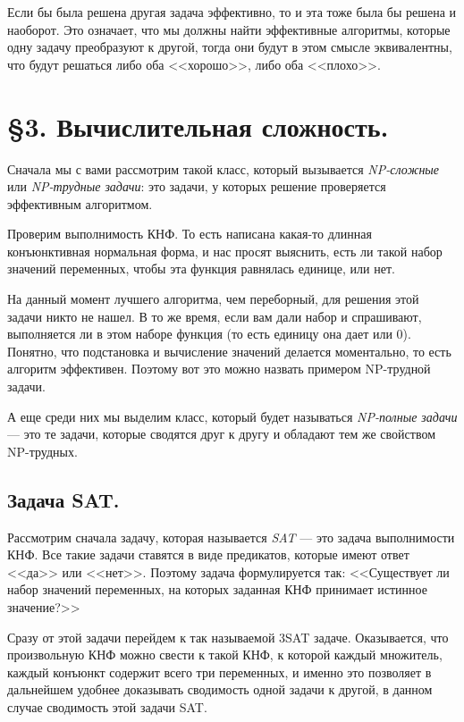 \documentclass[russian]{lecture-notes}
\theoremstyle{definition}
\begin{document}
	Если бы была решена другая задача эффективно, то и эта тоже была бы решена и наоборот. Это означает, что мы должны найти эффективные алгоритмы, которые одну задачу преобразуют к другой, тогда они будут в этом смысле эквивалентны, что будут решаться либо оба <<хорошо>>, либо оба <<плохо>>.
	
	\section*{\S3. Вычислительная сложность.}
	
	Сначала мы с вами рассмотрим такой класс, который вызывается {\em NP-сложные} или {\em NP-трудные задачи}: это задачи, у которых решение проверяется эффективным алгоритмом. 
	
	\begin{example*} 
		Проверим выполнимость КНФ. То есть написана какая-то длинная конъюнктивная нормальная форма, и нас просят выяснить, есть ли такой набор значений переменных, чтобы эта функция равнялась единице, или нет. 
	
		На данный момент лучшего алгоритма, чем переборный, для решения этой задачи никто не нашел. В то же время, если вам дали набор и спрашивают, выполняется ли в этом наборе функция (то есть единицу она дает или 0). Понятно, что подстановка и вычисление значений делается моментально, то есть алгоритм эффективен. Поэтому вот это можно назвать примером NP-трудной задачи.
	\end{example*}

	А еще среди них мы выделим класс, который будет называться {\em NP-полные задачи} --- это те задачи, которые сводятся друг к другу и обладают тем же свойством NP-трудных.
	
	\subsection*{Задача SAT.}
		Рассмотрим сначала задачу, которая называется {\em SAT} --- это задача выполнимости КНФ. Все такие задачи ставятся в виде предикатов, которые имеют ответ <<да>> или <<нет>>. Поэтому задача формулируется так: <<Существует ли набор значений переменных, на которых заданная КНФ принимает истинное значение?>>
		
		Сразу от этой задачи перейдем к так называемой 3SAT задаче. Оказывается, что произвольную КНФ можно свести к такой КНФ, к которой каждый множитель, каждый конъюнкт содержит всего три переменных, и именно это позволяет в дальнейшем удобнее доказывать сводимость одной задачи к другой, в данном случае сводимость этой задачи SAT.
		
\end{document}
